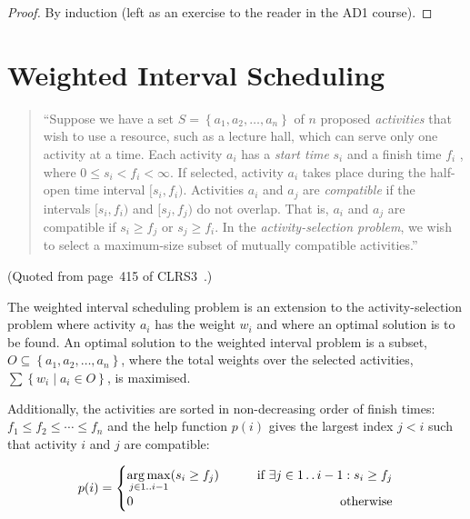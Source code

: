 \documentclass[a4paper,11pt]{article}
\newcommand{\twodots}{\mathinner{\ldotp\ldotp}}  %
\newcommand{\Set}[1]{\left\{#1\right\}}
\newcommand{\SetComp}[2]{\Set{#1\SuchThat#2}}
\newcommand{\SuchThat}{\mid}
\begin{document}
\begin{proof}
  By induction (left as an exercise to the reader in the AD1 course).
\end{proof}

\part{Weighted Interval Scheduling}\label{part:dp}
\setcounter{section}{0} %

\begin{quote}
``Suppose we have a set $S = \Set{a_1, a_2, \dots, a_n}$ of $n$ proposed
\emph{activities} that wish to use a resource, such as a lecture hall,
which can serve only one activity at a time. Each activity $a_i$ has a
\emph{start time} $s_i$ and a finish time $f_i$ , where
$0 \leq s_i < f_i < \infty$. If selected, activity $a_i$ takes place
during the half-open time interval $[s_i, f_i)$. Activities $a_i$ and
$a_j$ are \emph{compatible} if the intervals $[s_i, f_i)$ and
$[s_j, f_j)$ do not overlap. That is, $a_i$ and $a_j$ are compatible if
$s_i \geq f_j$ or $s_j \geq f_i$. In the 
\emph{activity-selection problem}, we wish to select a maximum-size
subset of mutually compatible activities.''
\end{quote}
(Quoted from page~415 of
CLRS3~\cite{CLRS}.)

The weighted interval scheduling problem is an extension to the 
activity-selection problem where activity $a_i$ has the weight $w_i$ and
where an optimal solution is to be found. An optimal solution to the
weighted interval problem is a subset,
$O \subseteq \Set{a_1, a_2, \dots, a_n}$, where the total weights over
the selected activities, $\sum \SetComp{w_i}{a_i \in O}$, is maximised.

Additionally, the activities are sorted in non-decreasing order of
finish times: $f_1 \leq f_2 \leq \cdots \leq f_n$ and the help function
$p(i)$ gives the largest index $j < i$ such that activity $i$ and $j$ are
compatible:

\begin{equation} \label{dp:helpfun}
  p(i) = 
  \begin{cases}
	\mathop{\mathrm{arg\,max}}\limits_{j\in 1 \twodots i-1} ( s_i \geq f_j ) & \hfill \qquad \text{if } \exists j \in 1\twodots i-1 : s_i \geq f_j \\
	0 & \hfill \text{otherwise}
  \end{cases}
\end{equation}
\end{document}
